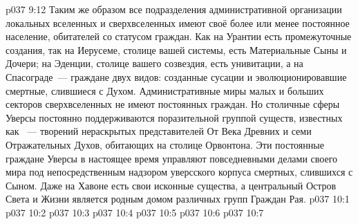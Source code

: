 \vs p037 9:12 \pc Таким же образом все подразделения административной организации локальных вселенных и сверхвселенных имеют своё более или менее постоянное население, обитателей со статусом граждан. Как на Урантии есть промежуточные создания, так на Иерусеме, столице вашей системы, есть Материальные Сыны и Дочери; на Эденции, столице вашего созвездия, есть унивитации, а на Спасограде~--- граждане двух видов: созданные сусации и эволюционировавшие смертные, слившиеся с Духом. Административные миры малых и больших секторов сверхвселенных не имеют постоянных граждан. Но столичные сферы Уверсы постоянно поддерживаются поразительной группой существ, известных как ~--- творений нераскрытых представителей От Века Древних и семи Отражательных Духов, обитающих на столице Орвонтона. Эти постоянные граждане Уверсы в настоящее время управляют повседневными делами своего мира под непосредственным надзором уверсского корпуса смертных, слившихся с Сыном. Даже на Хавоне есть свои исконные существа, а центральный Остров Света и Жизни является родным домом различных групп Граждан Рая.
\vs p037 10:1 
\vs p037 10:2 \pc 
\vs p037 10:3 \pc 
\vs p037 10:4 \pc 
\vs p037 10:5 
\vs p037 10:6 
\vsetoff
\vs p037 10:7 
\quizlink
